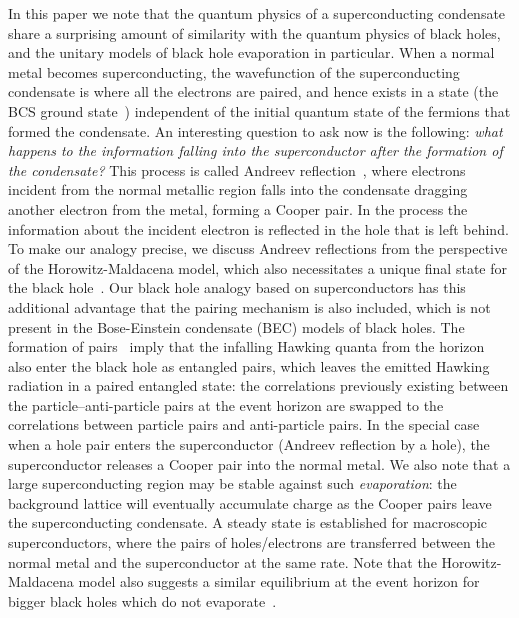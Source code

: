 \documentclass[12pt,letterpaper,aps,onecolumn,superscriptaddress,floatfix,notitlepage]{revtex4-1}
\begin{document}
	In this paper we note that the quantum physics of a superconducting condensate share a surprising amount of similarity with the quantum physics of black holes, and the unitary models of black hole evaporation in particular. When a normal metal becomes superconducting, the wavefunction of the superconducting condensate is where all the electrons are paired, and hence exists in a state (the BCS ground state~\cite{BCS}) independent of the initial quantum state of the fermions that formed the condensate. An interesting question to ask now is the following: \textit{what happens to the information falling into the superconductor after the formation of the condensate?} This process is called Andreev reflection~\cite{andreev,Pannet,spintron,artemenko1978excess,artemenko1979theory,artemenko1979excess,zaitsev1980theory}, where electrons incident from the normal metallic region falls into the condensate dragging another electron from the metal, forming a Cooper pair. In the process the information about the incident electron is reflected in the hole that is left behind. To make our analogy precise, we discuss Andreev reflections from the perspective of the Horowitz-Maldacena model, which also necessitates a unique final state for the black hole~\cite{horowitz,projection}. Our black hole analogy based on superconductors has this additional advantage that the pairing mechanism is also included, which is not present in the Bose-Einstein condensate (BEC) models of black holes. The formation of pairs~\cite{horowitz,projection} imply that the infalling Hawking quanta from the horizon also enter the black hole as entangled pairs, which leaves the emitted Hawking radiation in a paired entangled state: the correlations previously existing between the particle--anti-particle pairs at the event horizon are swapped to the correlations between particle pairs and anti-particle pairs. In the special case when a hole pair enters the superconductor (Andreev reflection by a hole), the superconductor releases a Cooper pair into the normal metal. We also note that a large superconducting region may be stable against such \textit{evaporation}: the background lattice will eventually accumulate charge as the Cooper pairs leave the superconducting condensate. A steady state is established for macroscopic superconductors, where the pairs of holes/electrons are transferred between the normal metal and the superconductor at the same rate. Note that the Horowitz-Maldacena model also suggests a similar equilibrium at the event horizon for bigger black holes which do not evaporate~\cite{horowitz}.        
	
\end{document}
